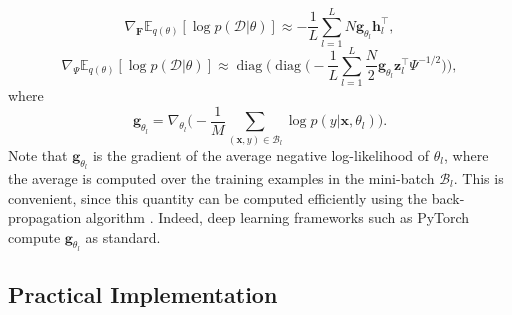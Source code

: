 \documentclass[msc,deptreport.inf]{infthesis} %
\newcommand{\matr}[1]{\mathbf{#1}}
\newcommand{\E}{\mathbb E}
\newcommand{\diag}{\mathop{\mathrm{diag}}}
\begin{document}
\begin{equation}
	 \nabla_\matr{F} \E_{q(\theta)} [\log p(\mathcal{D} | \theta)]
	 \approx -\frac{1}{L} \sum_{l=1}^{L} N \matr{g}_{\theta_l} \matr{h}_l^\intercal,
\end{equation}
\begin{equation}\label{eqn:grad_likelihood_wrt_psi}
	 \nabla_\Psi \E_{q(\theta)} [\log p(\mathcal{D} | \theta)]
	 \approx \diag\Bigg( \diag\Bigg( -\frac{1}{L} \sum_{l=1}^{L} \frac{N}{2} \matr{g}_{\theta_l} \matr{z}_l^\intercal \Psi^{-1/2} \Bigg)\Bigg),
\end{equation}
where
\begin{equation}
	\matr{g}_{\theta_l} = \nabla_{\theta_l} \Bigg( -\frac{1}{M} \sum_{(\matr{x}, y) \in \mathcal{B}_l} \log p(y | \matr{x}, \theta_l) \Bigg).
\end{equation}
Note that $\matr{g}_{\theta_l}$ is the gradient of the average negative log-likelihood of $\theta_l$, where the average is computed over the training examples in the mini-batch $\mathcal{B}_l$. This is convenient, since this quantity can be computed efficiently using the back-propagation algorithm \cite{rumelhart1986}. Indeed, deep learning frameworks such as PyTorch \cite{paszke2019} compute $\matr{g}_{\theta_l}$ as standard. 


\subsection{Practical Implementation}
\end{document}
